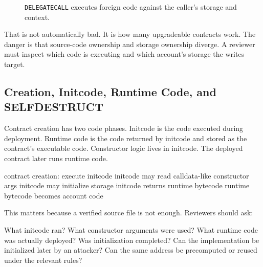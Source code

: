 \begin{figure}[htbp]
\centering
{}
\caption{\texttt{DELEGATECALL} executes foreign code against the caller's storage and context.}
\end{figure}

That is not automatically bad. It is how many upgradeable contracts work. The danger is that source-code ownership and storage ownership diverge. A reviewer must inspect which code is executing and which account's storage the writes target.

\subsection{Creation, Initcode, Runtime Code, and SELFDESTRUCT}

Contract creation has two code phases. Initcode is the code executed during deployment. Runtime code is the code returned by initcode and stored as the contract's executable code. Constructor logic lives in initcode. The deployed contract later runs runtime code.

\begin{codeblock}
contract creation:
    execute initcode
    initcode may read calldata-like constructor args
    initcode may initialize storage
    initcode returns runtime bytecode
    runtime bytecode becomes account code
\end{codeblock}

This matters because a verified source file is not enough. Reviewers should ask:

\begin{codeblock}
What initcode ran?
What constructor arguments were used?
What runtime code was actually deployed?
Was initialization completed?
Can the implementation be initialized later by an attacker?
Can the same address be precomputed or reused under the relevant rules?
\end{codeblock}

